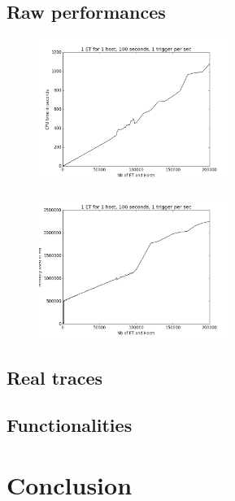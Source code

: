\documentclass[a4paper]{IEEEtran}
\begin{document}
  \subsection{Raw performances}
    \begin{figure}
      \centering
      \includegraphics[width=0.55\textwidth]{../plots/raw_perf_time}
      \label{time_raw}
    \end{figure}
    \begin{figure}
      \centering
      \includegraphics[width=0.55\textwidth]{../plots/raw_perf_mem}
      \label{mem_raw}
    \end{figure}
    
    
  \subsection{Real traces}
  
  \subsection{Functionalities}
  

\section{Conclusion} \label{conclu}





\end{document}

